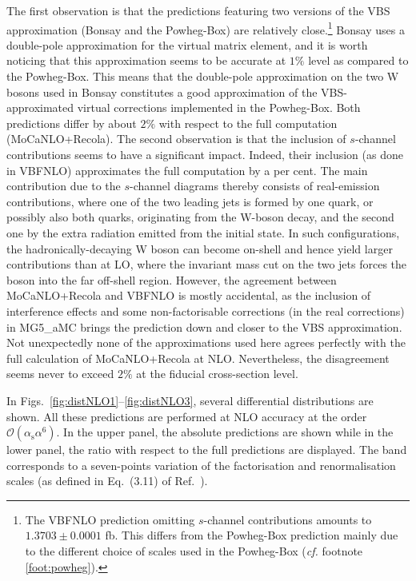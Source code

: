 \documentclass[twocolumn,epjc3]{svjour3} %
\newcommand{\alphas}{\ensuremath{\alpha_\text{s}}\xspace}
\begin{document}
    The first observation is that the predictions featuring two versions
    of the VBS approximation ({\sc Bonsay} and the {\sc Powheg-Box}) are
    relatively close.\footnote{The {\sc VBFNLO} prediction omitting
    $s$-channel contributions amounts to $1.3703 \pm 0.0001$ fb. This differs from
    the {\sc Powheg-Box} prediction mainly due to the different choice of
    scales used in the {\sc Powheg-Box} (\emph{cf.}
    footnote \ref{foot:powheg}).} {\sc Bonsay} uses a double-pole
    approximation for the virtual matrix element, and it is worth noticing
    that this approximation seems to be accurate at $1\%$ level as
    compared to the {\sc Powheg-Box}. This means that the double-pole
    approximation on the two W bosons used in {\sc Bonsay} constitutes a
    good approximation of the VBS-approxi\-mated virtual corrections
    implemented in the {\sc Powheg-Box}.  Both predictions differ by about
    $2\%$ with respect to the full computation ({\sc MoCaNLO+Recola}).
    The second observation is that the inclusion of $s$-channel
    contributions seems to have a significant impact.  Indeed, their
    inclusion (as done in {\sc VBFNLO}) approximates the full computation
    by a per cent. The main contribution due to 
    the $s$-channel diagrams thereby consists of real-emission
    contributions, where one of the two leading jets is formed by one
    quark, or possibly also both quarks, originating from the W-boson decay,
    and the second one by the extra radiation emitted from the initial
    state. In such configurations, the hadronically-decaying W boson can
    become on-shell and hence yield larger contributions than at LO, where
    the invariant mass cut on the two jets forces the boson into the far
    off-shell region.
    However, the agreement between {\sc MoCaNLO+Recola} and {\sc VBFNLO} is mostly accidental, as the inclusion of interference effects and some non-factorisable corrections (in the real corrections) in {\sc MG5\_aMC} brings the prediction down and closer to the VBS approximation.
    Not unexpectedly none of the approximations used here agrees perfectly with the full calculation of {\sc MoCaNLO\-+Recola} at NLO.
    Nevertheless, the disagreement seems never to exceed $2\%$ at the fiducial cross-section level.

    In Figs.~\ref{fig:distNLO1}--\ref{fig:distNLO3}, several differential distributions are shown.
    All these predictions are performed at NLO accuracy at the order $\mathcal{O}(\alphas\alpha^6)$.
    In the upper panel, the absolute predictions are shown while in the lower panel, the ratio with respect to the full predictions are displayed.
    The band corresponds to a seven-points variation of the factorisation and renormalisation scales (as defined in Eq.~(3.11) of Ref.~\cite{Biedermann:2017bss}).
\end{document}
